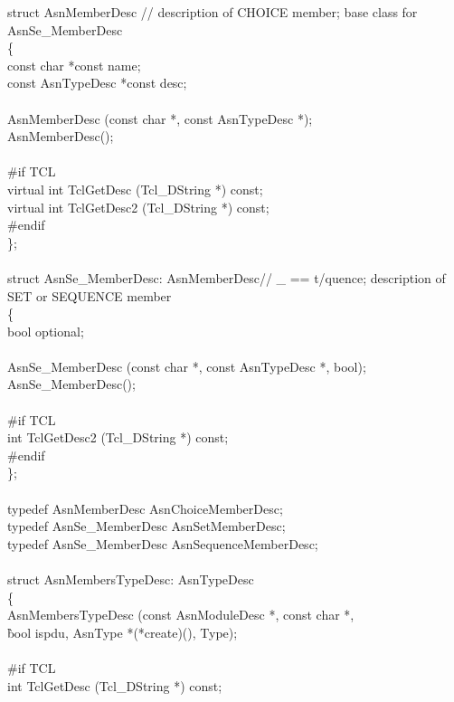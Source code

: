 \begin{Ccode}
struct AsnMemberDesc // description of CHOICE member; base class for AsnSe\_MemberDesc\\
\{\+\\
  const char			\>\>*const name;\\
  const AsnTypeDesc		\>\>*const desc;\\
\\
				\>\>AsnMemberDesc (const char *, const AsnTypeDesc *);\\
				\>\>AsnMemberDesc();\\
\\
\<\#if TCL\\
  virtual int			\>\>TclGetDesc (Tcl\_DString *) const;\\
  virtual int			\>\>TclGetDesc2 (Tcl\_DString *) const;\-\\
\#endif\\
\};\\
\\
struct AsnSe\_MemberDesc: AsnMemberDesc\qquad// \_ == t/quence; description of SET or SEQUENCE member\\
\{\+\\
  bool				\>\>optional;\\
\\
				\>\>AsnSe\_MemberDesc (const char *, const AsnTypeDesc *, bool);\\
				\>\>AsnSe\_MemberDesc();\\
\-\\
\#if TCL\\
  \>int				\>\>TclGetDesc2 (Tcl\_DString *) const;\\
\#endif\\
\};\\
\\
typedef AsnMemberDesc		\>\>\>AsnChoiceMemberDesc;\\
typedef AsnSe\_MemberDesc	\>\>\>AsnSetMemberDesc;\\
typedef AsnSe\_MemberDesc	\>\>\>AsnSequenceMemberDesc;\\
\\
struct AsnMembersTypeDesc: AsnTypeDesc\\
\{\+\\
				\>\>AsnMembersTypeDesc (const AsnModuleDesc *, const char *,\\
					\`bool ispdu, AsnType *(*create)(), Type);\\
\\
\<\#if TCL\\
  int				\>\>TclGetDesc (Tcl\_DString *) const;\-\\

\end{Ccode}
